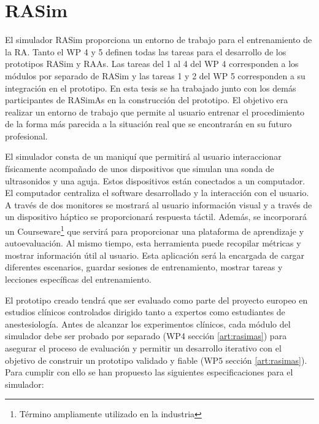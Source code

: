 \section{RASim}
\label{rasim:rasim}
El simulador \ac{RASim} proporciona un entorno de trabajo para el entrenamiento de la \ac{RA}. Tanto el \ac{WP} 4 y 5 definen todas las tareas para el desarrollo de los prototipos \ac{RASim} y \ac{RAAs}. Las tareas del 1 al 4 del \ac{WP} 4 corresponden a los módulos por separado de \ac{RASim} y las tareas 1 y 2 del \ac{WP} 5 corresponden a su integración en el prototipo. En esta tesis se ha trabajado junto con los demás participantes de \ac{RASimAs} en la construcción del prototipo. El objetivo era realizar un entorno de trabajo que permite al usuario entrenar el procedimiento de la forma más parecida a la situación real que se encontrarán en su futuro profesional.

El simulador consta de un maniquí que permitirá al usuario interaccionar físicamente acompañado de unos dispositivos que simulan una sonda de ultrasonidos y una aguja. Estos dispositivos están conectados a un computador. El computador centraliza el software desarrollado y la interacción con el usuario. A través de dos monitores se mostrará al usuario información visual y a través de un dispositivo háptico se proporcionará respuesta táctil. Además, se incorporará un \ac{Courseware}\footnote{Término ampliamente utilizado en la industria } que servirá para proporcionar una plataforma de aprendizaje y autoevaluación. Al mismo tiempo, esta herramienta puede recopilar métricas y mostrar información útil al usuario. Esta aplicación será la encargada de cargar diferentes escenarios, guardar sesiones de entrenamiento, mostrar tareas y lecciones específicas del entrenamiento.

El prototipo creado tendrá que ser evaluado como parte del proyecto europeo en estudios clínicos controlados dirigido tanto a expertos como estudiantes de anestesiología. Antes de alcanzar los experimentos clínicos, cada módulo del simulador debe ser probado por separado (\ac{WP}4 sección \ref{art:rasimas}) para asegurar el proceso de evaluación y permitir un desarrollo iterativo con el objetivo de construir un prototipo validado y fiable (\ac{WP}5 sección \ref{art:rasimas}). Para cumplir con ello se han propuesto las siguientes especificaciones para el simulador:

